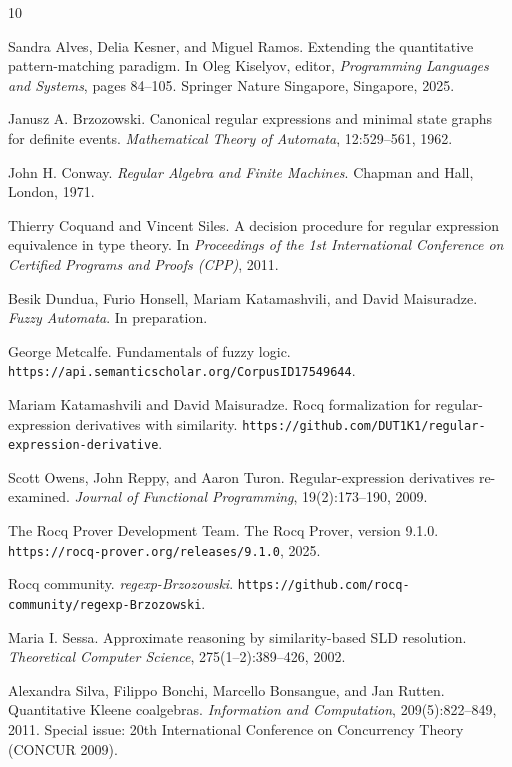 \documentclass{easychair}
\begin{document}
\begin{thebibliography}{10}

Sandra Alves, Delia Kesner, and Miguel Ramos.
\newblock Extending the quantitative pattern-matching paradigm.
\newblock In Oleg Kiselyov, editor, \emph{Programming Languages and Systems},
pages 84--105.
\newblock Springer Nature Singapore, Singapore, 2025.

Janusz A. Brzozowski.
\newblock Canonical regular expressions and minimal state graphs for definite events.
\newblock \emph{Mathematical Theory of Automata}, 12:529--561, 1962.

John H. Conway.
\newblock \emph{Regular Algebra and Finite Machines}.
\newblock Chapman and Hall, London, 1971.

Thierry Coquand and Vincent Siles.
\newblock A decision procedure for regular expression equivalence in type theory.
\newblock In \emph{Proceedings of the 1st International Conference on Certified Programs and Proofs (CPP)}, 2011.

Besik Dundua, Furio Honsell, Mariam Katamashvili, and David Maisuradze.
\newblock \emph{Fuzzy Automata}.
\newblock In preparation.

George Metcalfe.
\newblock Fundamentals of fuzzy logic.
\newblock \texttt{https://api.semanticscholar.org/CorpusID17549644}.

Mariam Katamashvili and David Maisuradze.
\newblock Rocq formalization for regular-expression derivatives with similarity.
\newblock \texttt{https://github.com/DUT1K1/regular-expression-derivative}.

Scott Owens, John Reppy, and Aaron Turon.
\newblock Regular-expression derivatives re-examined.
\newblock \emph{Journal of Functional Programming}, 19(2):173--190, 2009.

The Rocq Prover Development Team.
\newblock The Rocq Prover, version 9.1.0.
\newblock \texttt{https://rocq-prover.org/releases/9.1.0}, 2025.

Rocq community.
\newblock \emph{regexp-Brzozowski}.
\newblock \texttt{https://github.com/rocq-community/regexp-Brzozowski}.

Maria I. Sessa.
\newblock Approximate reasoning by similarity-based SLD resolution.
\newblock \emph{Theoretical Computer Science}, 275(1--2):389--426, 2002.

Alexandra Silva, Filippo Bonchi, Marcello Bonsangue, and Jan Rutten.
\newblock Quantitative Kleene coalgebras.
\newblock \emph{Information and Computation}, 209(5):822--849, 2011.
\newblock Special issue: 20th International Conference on Concurrency Theory
(CONCUR 2009).

\end{thebibliography}
\end{document}

